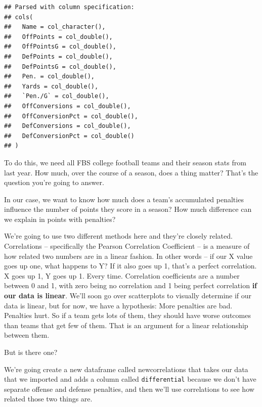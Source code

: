 \documentclass[]{book}
\newenvironment{Shaded}{\begin{snugshade}}{\end{snugshade}}
\newcommand{\DataTypeTok}[1]{\textcolor[rgb]{0.13,0.29,0.53}{#1}}
\newcommand{\KeywordTok}[1]{\textcolor[rgb]{0.13,0.29,0.53}{\textbf{#1}}}
\newcommand{\NormalTok}[1]{#1}
\newcommand{\OperatorTok}[1]{\textcolor[rgb]{0.81,0.36,0.00}{\textbf{#1}}}
\newcommand{\StringTok}[1]{\textcolor[rgb]{0.31,0.60,0.02}{#1}}
\begin{document}
\begin{verbatim}
## Parsed with column specification:
## cols(
##   Name = col_character(),
##   OffPoints = col_double(),
##   OffPointsG = col_double(),
##   DefPoints = col_double(),
##   DefPointsG = col_double(),
##   Pen. = col_double(),
##   Yards = col_double(),
##   `Pen./G` = col_double(),
##   OffConversions = col_double(),
##   OffConversionPct = col_double(),
##   DefConversions = col_double(),
##   DefConversionPct = col_double()
## )
\end{verbatim}

To do this, we need all FBS college football teams and their season stats from last year. How much, over the course of a season, does a thing matter? That's the question you're going to answer.

In our case, we want to know how much does a team's accumulated penalties influence the number of points they score in a season? How much difference can we explain in points with penalties?

We're going to use two different methods here and they're closely related. Correlations -- specifically the Pearson Correlation Coefficient -- is a measure of how related two numbers are in a linear fashion. In other words -- if our X value goes up one, what happens to Y? If it also goes up 1, that's a perfect correlation. X goes up 1, Y goes up 1. Every time. Correlation coefficients are a number between 0 and 1, with zero being no correlation and 1 being perfect correlation \textbf{if our data is linear}. We'll soon go over scatterplots to visually determine if our data is linear, but for now, we have a hypothesis: More penalties are bad. Penalties hurt. So if a team gets lots of them, they should have worse outcomes than teams that get few of them. That is an argument for a linear relationship between them.

But is there one?

We're going create a new dataframe called newcorrelations that takes our data that we imported and adds a column called \texttt{differential} because we don't have separate offense and defense penalties, and then we'll use correlations to see how related those two things are.

\begin{Shaded}
\end{Shaded}
\end{document}
